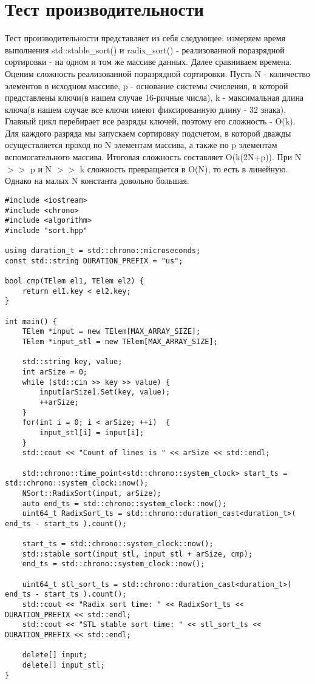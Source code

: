 \section{Тест производительности}
{\itshape}

Тест производительности представляет из себя следующее: измеряем время выполнения std::stable\_sort() и radix\_sort() - реализованной поразрядной сортировки - на одном и том же массиве данных. 
Далее сравниваем времена.\newline
Оценим сложность реализованной поразрядной сортировки. Пусть N - количество элементов в исходном массиве, p - основание системы счисления, в которой представлены ключи(в нашем случае 16-ричные числа), k - максимальная длина ключа(в нашем случае все ключи имеют фиксированную длину - 32 знака).\newline 
Главный цикл перебирает все разряды ключей, поэтому его сложность - O(k). Для каждого разряда мы запускаем сортировку подсчетом, в которой дважды осуществляется проход по N элементам массива, а также по p элементам вспомогательного массива.
Итоговая сложность составляет O(k(2N+p)). При N $>>$ p и N $>>$ k сложность превращается в O(N), то есть в линейную. Однако на малых N константа довольно большая.

\begin{lstlisting}
#include <iostream>
#include <chrono>
#include <algorithm>
#include "sort.hpp"

using duration_t = std::chrono::microseconds;
const std::string DURATION_PREFIX = "us";

bool cmp(TElem el1, TElem el2) {
    return el1.key < el2.key;
}

int main() {
    TElem *input = new TElem[MAX_ARRAY_SIZE];
    TElem *input_stl = new TElem[MAX_ARRAY_SIZE];

    std::string key, value;
    int arSize = 0;
    while (std::cin >> key >> value) {
        input[arSize].Set(key, value);
        ++arSize;
    }
    for(int i = 0; i < arSize; ++i)  {
        input_stl[i] = input[i]; 
    }
    std::cout << "Count of lines is " << arSize << std::endl;

    std::chrono::time_point<std::chrono::system_clock> start_ts = std::chrono::system_clock::now();
    NSort::RadixSort(input, arSize);
    auto end_ts = std::chrono::system_clock::now();
    uint64_t RadixSort_ts = std::chrono::duration_cast<duration_t>( end_ts - start_ts ).count();
    
    start_ts = std::chrono::system_clock::now();
    std::stable_sort(input_stl, input_stl + arSize, cmp);
    end_ts = std::chrono::system_clock::now();

    uint64_t stl_sort_ts = std::chrono::duration_cast<duration_t>( end_ts - start_ts ).count();
    std::cout << "Radix sort time: " << RadixSort_ts << DURATION_PREFIX << std::endl;
    std::cout << "STL stable sort time: " << stl_sort_ts << DURATION_PREFIX << std::endl;

    delete[] input;
    delete[] input_stl;
}
\end{lstlisting}

